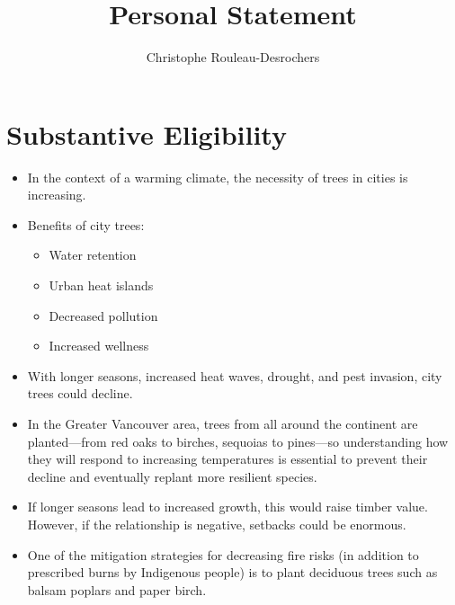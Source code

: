 \documentclass[11pt,letter]{article}
\title{Personal Statement}
\author{Christophe Rouleau-Desrochers}
\begin{document}

\maketitle



\section *{Substantive Eligibility}
\begin{itemize}
	\item In the context of a warming climate, the necessity of trees in cities is increasing.
	\item Benefits of city trees:
	\begin{itemize}
		\item Water retention
		\item Urban heat islands
		\item Decreased pollution
		\item Increased wellness
	\end{itemize}
	\item With longer seasons, increased heat waves, drought, and pest invasion, city trees could decline.
	\item In the Greater Vancouver area, trees from all around the continent are planted—from red oaks to birches, sequoias to pines—so understanding how they will respond to increasing temperatures is essential to prevent their decline and eventually replant more resilient species.
	\item If longer seasons lead to increased growth, this would raise timber value. However, if the relationship is negative, setbacks could be enormous.
	\item One of the mitigation strategies for decreasing fire risks (in addition to prescribed burns by Indigenous people) is to plant deciduous trees such as balsam poplars and paper birch.
\end{itemize}
\end{document}
